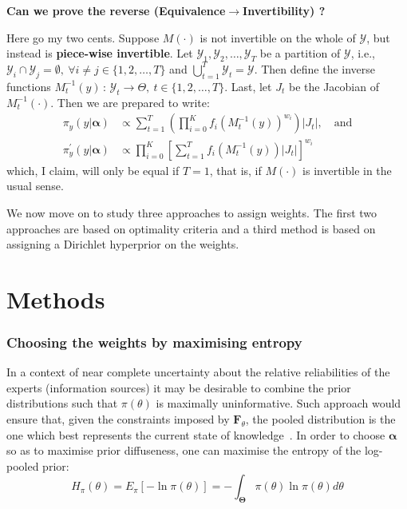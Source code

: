 \documentclass[a4paper, notitlepage, 10pt]{article}
\begin{document}
{\textbf{\large Can we prove the reverse (Equivalence$\to$Invertibility) ?}

Here go my two cents.
Suppose $M(\cdot)$ is not invertible on the whole of $\mathcal{Y}$, but instead is \textbf{piece-wise invertible}.
Let $\mathcal{Y}_1, \mathcal{Y}_2, \ldots, \mathcal{Y}_T$ be a  partition of $\mathcal{Y}$, i.e., $\mathcal{Y}_i\cap\mathcal{Y}_j = \emptyset,\: \forall i\neq j \in \{1, 2, \ldots, T\}$ and $\bigcup_{t = 1}^T\mathcal{Y}_t = \mathcal{Y}$.
Then define the inverse functions $M_{t}^{-1}(y)\,:\, \mathcal{Y}_t \to \Theta, \: t \in \{1, 2, \ldots, T\}$.
Last, let $J_t$ be the Jacobian of $M_{t}^{-1}(\cdot)$.
Then we are prepared to write:
\begin{align}
\label{eq:piecewiseTransf}
\pi_{y}(y |\boldsymbol\alpha) &\propto \sum_{t = 1}^T\left(\prod_{i=0}^K f_i(M_t^{-1}(y))^{w_i}\right)|J_t|, \quad \text{and}\\
\pi^{\prime}_{y}(y|\boldsymbol\alpha) &\propto \prod_{i=0}^K\left[\sum_{t = 1}^T f_i(M_t^{-1}(y))|J_t|\right]^{w_i}
\end{align}
which, I claim, will only be equal if $T = 1$, that is,  if $M(\cdot)$ is invertible in the usual sense.
}
We now move on to study three approaches to assign weights.
The first two approaches are based on optimality criteria and a third method is based on assigning a Dirichlet hyperprior on the weights.
\section*{Methods}

\subsubsection*{Choosing the weights by maximising entropy}

In a context of near complete uncertainty about the relative reliabilities of the experts (information sources) it may be desirable to combine the prior distributions such that $\pi(\theta)$ is maximally uninformative. %
Such approach would ensure that, given the constraints imposed by $\mathbf{F}_{\theta}$, the pooled distribution is the one which best represents the current state of knowledge~\citep{jaynes1957,savchuk1994}.
In order to choose $\boldsymbol\alpha$ so as to maximise prior 
diffuseness, one can maximise the entropy of the log-pooled prior:
\begin{equation}
\label{eq:entropypiA}
H_{\pi}(\theta) = E_{\pi}\left[-\ln\pi(\theta) \right] =-\int_{\boldsymbol\Theta}\pi(\theta)\ln\pi(\theta)d\theta 
\end{equation}
\end{document}
